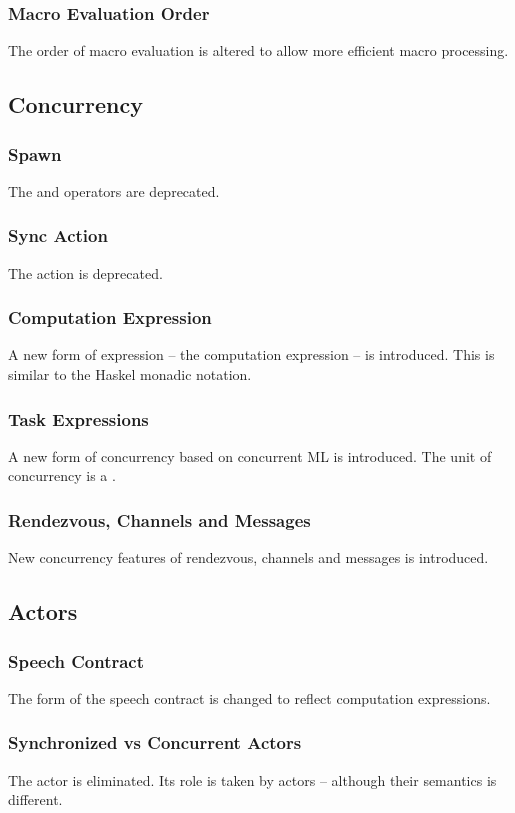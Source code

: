 \subsubsection{Macro Evaluation Order}
The order of macro evaluation is altered to allow more efficient macro processing.

\subsection{Concurrency}
\subsubsection{Spawn}
The  and \q{//} operators are deprecated.

\subsubsection{Sync Action}
The  action is deprecated.

\subsubsection{Computation Expression}
A new form of expression -- the computation expression -- is introduced. This is similar to the Haskel monadic  notation.

\subsubsection{Task Expressions}
A new form of concurrency based on concurrent ML is introduced. The unit of concurrency is a .

\subsubsection{Rendezvous, Channels and Messages}
New concurrency features of rendezvous, channels and messages is introduced.

\subsection{Actors}
\subsubsection{Speech Contract}
The form of the speech contract is changed to reflect computation expressions.

\subsubsection{Synchronized vs Concurrent Actors}
The  actor is eliminated. Its role is taken by  actors -- although their semantics is different.


